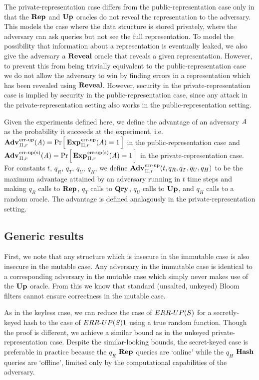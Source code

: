The private-representation case differs from the public-representation case only
in that the $\textup{\textbf{Rep}}\hspace{0.5pt}$ and $\textup{\textbf{Up}}\hspace{0.5pt}$ oracles do not reveal the representation to the
adversary. This models the case where the data structure is stored privately,
where the adversary can ask queries but not see the full representation. To
model the possibility that information about a representation is eventually
leaked, we also give the adversary a $\mathbf{Reveal}$ oracle that reveals a given
representation. However, to prevent this from being trivially equivalent to the
public-representation case we do not allow the adversary to win by finding
errors in a representation which has been revealed using $\mathbf{Reveal}$. However,
security in the private-representation case is implied by security in the
public-representation case, since any attack in the private-representation
setting also works in the public-representation setting.

Given the experiments defined here, we define the advantage of an adversary
$\mathit{A}$ as the probability it succeeds at the experiment, i.e.
$\Adv{\errep}_{\struct,r}(\advA) = \Prob{\Exp{\errep}_{\struct,r}(\advA) = 1}$
in the public-representation case and $\Adv{\erreps}_{\struct,r}(\advA) =
\Prob{\Exp{\erreps}_{\struct,r}(\advA) = 1}$ in the private-representation case.
For constants $t$, $q_R$, $q_T$, $q_U$, $q_H$, we define
$\Adv{\errep}_{\struct,r}(t,q_R,q_T,q_U,q_H)$ to be the maximum advantage
attained by an adversary running in $t$ time steps and making $q_R$ calls to
$\textup{\textbf{Rep}}\hspace{0.5pt}$, $q_T$ calls to $\textup{\textbf{Qry}}\hspace{0.5pt}$, $q_U$ calls to $\textup{\textbf{Up}}\hspace{0.5pt}$, and $q_H$ calls to a
random oracle. The advantage is defined analagously in the
private-representation setting.

\subsection{Generic results}
First, we note that any structure which is insecure in the immutable case is also insecure in the mutable case. Any adversary in the immutable case is identical to a corresponding adversary in the mutable case which simply never makes use of the $\textup{\textbf{Up}}\hspace{0.5pt}$ oracle. From this we know that standard (unsalted, unkeyed) Bloom filters cannot ensure correctness in the mutable case. 


As in the keyless case, we can reduce the case of ${ERR\mbox{-}UP(S)}$ for a secretly-keyed hash to the case of ${ERR\mbox{-}UP(S)}1$ using a true random function. Though the proof is different, we achieve a similar bound as in the unkeyed private-representation case. Despite the similar-looking bounds, the secret-keyed case is preferable in practice because the $q_R$ $\textup{\textbf{Rep}}\hspace{0.5pt}$ queries are `online' while the $q_H$ $\textup{\textbf{Hash}}\hspace{0.5pt}$ queries are `offline', limited only by the computational capabilities of the adversary.

